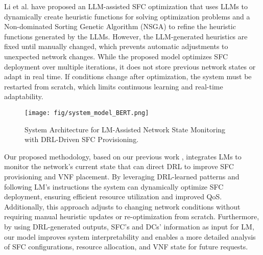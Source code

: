 Li et al.\cite{Li2025} have proposed an LLM-assisted  SFC optimization that uses LLMs to dynamically create heuristic functions for solving optimization problems and a Non-dominated Sorting Genetic Algorithm (NSGA) to refine the heuristic functions generated by the LLMs. However, the LLM-generated heuristics are fixed until manually changed, which prevents automatic adjustments to unexpected network changes. While the proposed model optimizes SFC deployment over multiple iterations, it does not  store previous network states or adapt in real time. If conditions change after optimization, the system must be restarted from scratch, which limits continuous learning and real-time adaptability.
 \begin{figure*}[!t]
        \centering
        \texttt{[image: fig/system\_model\_BERT.png]}
        \caption{System Architecture for LM-Assisted Network State Monitoring with DRL-Driven SFC Provisioning.}
        \label{fig:system} 
\end{figure*}
Our proposed methodology, based on our previous work \cite{arda24}, integrates  LMs to monitor the network's current state that can direct DRL to improve SFC provisioning and VNF placement. By leveraging DRL-learned patterns and following LM's instructions the system can dynamically optimize SFC deployment, ensuring efficient resource utilization and improved QoS. Additionally, this approach adjusts to changing network conditions without requiring manual heuristic updates or re-optimization from scratch. Furthermore, by using DRL-generated outputs, SFC's and DCs'  information as input for LM, our model improves system interpretability and enables a more detailed analysis of SFC configurations, resource allocation, and VNF state for future requests.